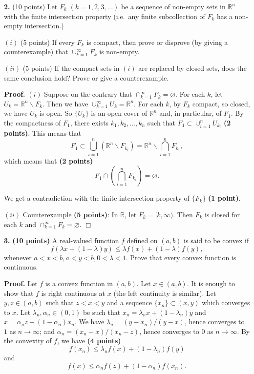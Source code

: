 \documentclass{article}
\begin{document}
    
    
    
    
    

    
    \textbf{2.} (10 points) Let $F_k$ $(k=1,2,3,\ldots)$ be a sequence of
non-empty sets in $\mathbb{R}^n$ with the finite intersection property
(i.e.~any finite subcollection of $F_k$ has a non-empty intersection.)

$(i)$ (5 points) If every $F_k$ is compact, then prove or disprove (by
giving a counterexample) that $\cup_{k=1}^{\infty} F_k$ is non-empty.

$(ii)$ (5 points) If the compact sets in $(i)$ are replaced by closed
sets, does the same conclusion hold? Prove or give a counterexample.

\textbf{Proof.} $(i)$ Suppose on the contrary that
$\cap_{k=1}^{\infty} F_k =\varnothing$. For each $k$, let
$U_k = \mathbb{R}^n \backslash F_k$. Then we have
$\cup_{k=1}^{\infty} U_k = \mathbb{R}^n$. For each $k$, by $F_k$
compact, so closed, we have $U_k$ is open. So $\{U_k\}$ is an open cover
of $\mathbb{R}^n$ and, in particular, of $F_1$. By the compactness of
$F_1$, there exists $k_1,k_2,\ldots,k_n$ such that
$F_1 \subset \cup_{i=1}^n U_{k_i }$ \textbf{(2 points)}. This means that
\[ F_1 \subset \bigcup_{i=1}^n (\mathbb{R}^n \backslash F_{k_i}) = \mathbb{R}^n \backslash \bigcap_{i=1}^n F_{k_i},\]
which means that \textbf{(2 points)}
\[ F_1 \cap \left(\bigcap_{i=1}^n F_{k_i}\right) = \varnothing.\]

We get a contradiction with the finite intersection property of
$\{F_k\}$ \textbf{(1 point)}.

$(ii)$ Counterexample \textbf{(5 points)}: In $\mathbb{R}$, let
$F_k = [k,\infty)$. Then $F_k$ is closed for each $k$ and
$\cap_{k=1}^{\infty} F_k=  \varnothing$. $\Box$

    \textbf{3.} \textbf{(10 points)} A real-valued function $f$ defined on
$(a,b)$ is said to be convex if
\[ f(\lambda x + (1-\lambda)y) \le \lambda f(x) + (1-\lambda)f(y),\]
whenever $a < x < b,a < y < b, 0 < \lambda < 1$. Prove that every convex
function is continuous.

\textbf{Proof.} Let $f$ is a convex function in $(a,b)$. Let
$x\in (a,b)$. It is enough to show that $f$ is right continuous at $x$
(the left continuity is similar). Let $y, z \in (a,b)$ such that
$z < x < y$ and a sequence $\{x_n\}\subset (x,y)$ which converges to
$x$. Let $\lambda_n,\alpha_n\in (0,1)$ be such that
$x_n = \lambda_n x + (1-\lambda_n)y$ and
$x = \alpha_n z + (1-\alpha_n)x_n$. We have $\lambda_n = (y-x_n)/(y-x)$,
hence converges to $1$ as $n\to \infty$; and
$\alpha_n = (x_n-x)/(x_n-z)$, hence converges to $0$ as $n\to \infty$.
By the convexity of $f$, we have \textbf{(4 points)} \[
f(x_n) \le \lambda_n f(x) + (1-\lambda_n)f(y)
\] and \[
f(x) \le \alpha_n f(z) + (1-\alpha_n) f(x_n).
\]
\end{document}
